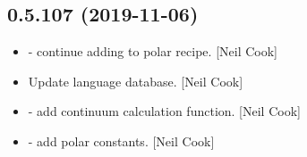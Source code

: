 \documentclass[a4paper,10pt,english]{report}
\begin{document}
\subsection{0.5.107 (2019-11-06)}
\label{\detokenize{misc/changelog:id36}}\begin{itemize}
\item {} 
 - continue adding to polar recipe.
{[}Neil Cook{]}

\item {} 
Update language database. {[}Neil Cook{]}

\item {} 
 - add continuum calculation function. {[}Neil Cook{]}

\item {} 
 - add polar constants. {[}Neil
Cook{]}

\end{itemize}
\end{document}
